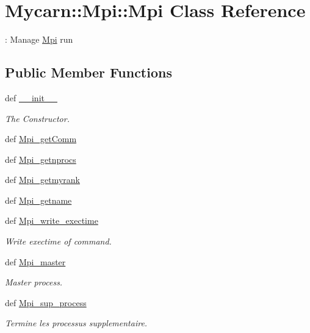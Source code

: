 \hypertarget{classMycarn_1_1Mpi_1_1Mpi}{
\section{\-Mycarn\-:\-:\-Mpi\-:\-:\-Mpi \-Class \-Reference}
\label{classMycarn_1_1Mpi_1_1Mpi}
}


\-: \-Manage \hyperlink{classMycarn_1_1Mpi_1_1Mpi}{\-Mpi} run  


\subsection*{\-Public \-Member \-Functions}
\begin{DoxyCompactItemize}
\item 
def \hyperlink{classMycarn_1_1Mpi_1_1Mpi_a0249051495253603f31009e2fc89a7cb}{\-\_\-\-\_\-init\-\_\-\-\_\-}
\begin{DoxyCompactList}\small\item\em \-The \-Constructor. \end{DoxyCompactList}\item 
def \hyperlink{classMycarn_1_1Mpi_1_1Mpi_a27e821d1b24fd907c40825b3423719fb}{\-Mpi\-\_\-get\-Comm}
\item 
def \hyperlink{classMycarn_1_1Mpi_1_1Mpi_ab57aa74cc1d6121a3e4e5e52b9e4d8eb}{\-Mpi\-\_\-getnprocs}
\item 
def \hyperlink{classMycarn_1_1Mpi_1_1Mpi_a8ef4bfff0add369c67c20b4dac802f7f}{\-Mpi\-\_\-getmyrank}
\item 
def \hyperlink{classMycarn_1_1Mpi_1_1Mpi_ae95d2c27921e924c34cdcb3b412a1bc0}{\-Mpi\-\_\-getname}
\item 
def \hyperlink{classMycarn_1_1Mpi_1_1Mpi_af829248d36d7697b0a0538d13ca19c8e}{\-Mpi\-\_\-write\-\_\-exectime}
\begin{DoxyCompactList}\small\item\em \-Write exectime of command. \end{DoxyCompactList}\item 
def \hyperlink{classMycarn_1_1Mpi_1_1Mpi_ae54388f4162997b83a9b9b7d26637650}{\-Mpi\-\_\-master}
\begin{DoxyCompactList}\small\item\em \-Master process. \end{DoxyCompactList}\item 
def \hyperlink{classMycarn_1_1Mpi_1_1Mpi_a46e1833929e1162592fa000187424e92}{\-Mpi\-\_\-sup\-\_\-process}
\begin{DoxyCompactList}\small\item\em \-Termine les processus supplementaire. \end{DoxyCompactList}\item 

\end{DoxyCompactItemize}
